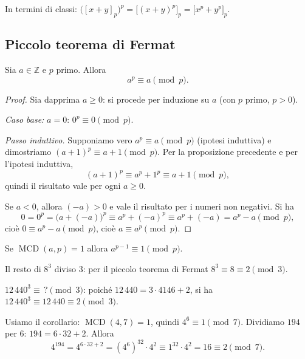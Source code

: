 \documentclass[11pt,a4paper]{article}
\begin{document}
\begin{osservazione}
In termini di classi: $\big([x + y]_p\big)^p = \big[(x + y)^p\big]_p = \big[x^p + y^p\big]_p$.
\end{osservazione}

\subsection{Piccolo teorema di Fermat}

\begin{teorema}
Sia $a \in \mathbb{Z}$ e $p$ primo. Allora
\[
  a^p \equiv a \pmod p .
\]
\end{teorema}

\begin{proof}
Sia dapprima $a \ge 0$: si procede per induzione su $a$ (con $p$ primo, $p > 0$).

\emph{Caso base:} $a = 0$: $0^p \equiv 0 \pmod p$.

\emph{Passo induttivo.} Supponiamo vero $a^p \equiv a \pmod p$ (ipotesi induttiva) e dimostriamo $(a+1)^p \equiv a + 1 \pmod p$. Per la proposizione precedente e per l'ipotesi induttiva,
\[
  (a + 1)^p \equiv a^p + 1^p \equiv a + 1 \pmod p ,
\]
quindi il risultato vale per ogni $a \ge 0$.

Se $a < 0$, allora $(-a) > 0$ e vale il risultato per i numeri non negativi. Si ha
\[
  0 = 0^p = \big(a + (-a)\big)^p \equiv a^p + (-a)^p \equiv a^p + (-a) = a^p - a \pmod p ,
\]
cioè $0 \equiv a^p - a \pmod p$, cioè $a \equiv a^p \pmod p$.
\end{proof}

\begin{teorema}[Corollario]
Se $\operatorname{MCD}(a, p) = 1$ allora $a^{p-1} \equiv 1 \pmod p$.
\end{teorema}

\begin{esempio}
Il resto di $8^3$ diviso $3$: per il piccolo teorema di Fermat $8^3 \equiv 8 \equiv 2 \pmod 3$.

$12\,440^3 \equiv\, ?\pmod 3$: poiché $12\,440 = 3\cdot 4146 + 2$, si ha $12\,440^3 \equiv 12\,440 \equiv 2 \pmod 3$.
\end{esempio}

\begin{esempio}[$4^{194} \bmod 7$]
Usiamo il corollario: $\operatorname{MCD}(4, 7) = 1$, quindi $4^6 \equiv 1 \pmod 7$. Dividiamo $194$ per $6$: $194 = 6\cdot 32 + 2$. Allora
\[
  4^{194} = 4^{6\cdot 32 + 2} = \left(4^6\right)^{32}\cdot 4^2 \equiv 1^{32}\cdot 4^2 = 16 \equiv 2 \pmod 7 .
\]
\end{esempio}
\end{document}
